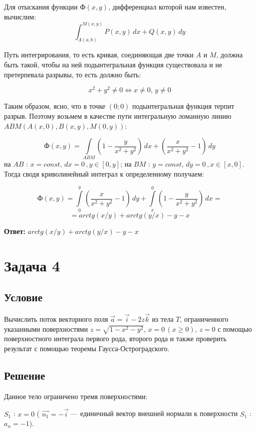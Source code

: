 \documentclass[12pt]{article}
\begin{document}
	Для отыскания функции $ Ф(x,y) $, дифференциал которой нам известен, вычислим: 
	$$ \int_{A(a,b)}^{M(x,y)} P(x,y) \,dx + Q(x,y) \, dy$$

	Путь интегрирования, то есть кривая, соединяющая две точки $ A $ и $ M $, должна быть такой, чтобы на ней подынтегральная функция существовала и не претерпевала разрывы, то есть должно быть:

	$$ x^2+y^2 \neq 0 \Leftrightarrow x \neq 0 , \, y \neq 0 $$

	Таким образом, ясно, что в точке $ (0;0) $ подынтегральная функция терпит разрыв. Поэтому возьмем в качестве пути интегральную ломанную линию $ ABM(A(x,0),B(x,y),M(0,y)) $:

	$$ Ф(x,y) = \int \limits_{ABM} (1-\frac{y}{x^2+y^2})\,dx + (\frac{x}{x^2+y^2}-1)\, dy $$
	на $ AB $ : $ x = const, \, dx = 0\, , y\in [0,y] $; на $ BM $ : $ y = const, \, dy = 0\, , x\in [x,0] $. Тогда сводя криволинейный интеграл к определенному получаем:

	$$ Ф(x,y) = \int \limits_0^y (\frac{x}{x^2+y^2}-1)\, dy + \int \limits_x^0 (1-\frac{y}{x^2+y^2})\,dx = $$
	$$ = arctg(x/y) + arctg(y/x) - y -x $$

	\hspace{240pt}\textbf{Ответ:} $ arctg(x/y) + arctg(y/x) - y - x $	

	\newpage
	\section*{Задача 4}	
	\subsection*{Условие}
	 
	Вычислить поток векторного поля $ \vec{a} = \vec{i} - 2z\vec{k} $ из тела $ T $, ограниченного указанными поверхностями $ z = \sqrt{1 - x^2 - y^2},\, x = 0 \, (x \geq 0), \, z=0 $ с помощью поверхностного интеграла первого рода, второго рода и также проверить результат с помощью теоремы Гаусса-Остроградского.

	\subsection*{Решение}

	Данное тело ограничено тремя поверхностями:

	$ S_1 $ : $ x = 0 $ ( $ \vec{n_1} = -\vec{i} $ --- единичный вектор внешней нормали к поверхности $ S_1 $ : $ a_n = -1 $).
\end{document}

